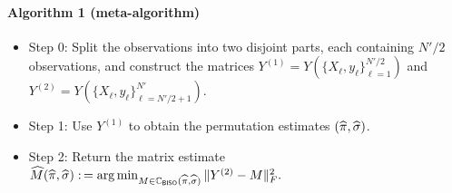 \documentclass[final,12pt]{colt2018} %
\begin{document}
\paragraph{Algorithm 1 (meta-algorithm)}
\begin{itemize}
\item Step 0: Split the observations into two disjoint parts, each containing $N'/2$ observations, and construct the matrices $Y^{(1)} = Y \left(\{X_\ell, y_\ell \}_{\ell = 1}^{N'/2} \right)$ and $Y^{(2)} = Y \left(\{X_\ell, y_\ell \}_{\ell = N'/2 + 1}^{N'} \right)$.
\item Step 1: Use $Y^{(1)}$ to obtain the permutation estimates $(\widehat{\pi}, \widehat{\sigma})$.
\item Step 2: Return the matrix estimate 
$
\widehat{M}(\widehat{\pi}, \widehat{\sigma}) :\,= \arg \min_{M \in \mathbb{C}_{\mathsf{BISO}}(\widehat{\pi}, \widehat{\sigma})} \| Y^{(2)} - M \|_F^2 .
$
\end{itemize}
%
\end{document}
